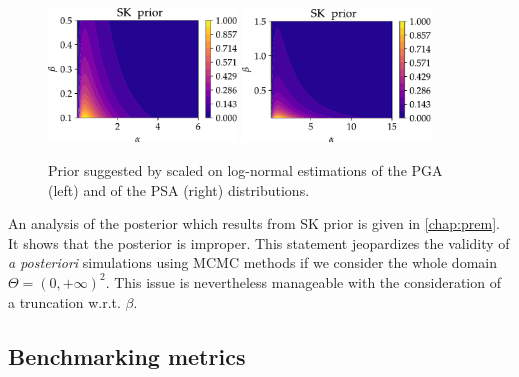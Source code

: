             \begin{figure}[!ht]
                \centering
                {\includegraphics[width=5cm]{figures/PREM/SK_prior_PGA.pdf}}\hspace*{0.5cm}
                {\includegraphics[width=5cm]{figures/PREM/SK_prior_PSA.pdf}}                
                \caption{Prior suggested by \citet{straub_improved_2008} scaled on log-normal estimations of the PGA (left) and of the PSA (right) distributions.}
                 \label{uncIM:fig:Straubprior}
            \end{figure}

            An analysis of the posterior which results from SK prior is given in \cref{chap:prem}. It shows that the posterior is improper. This statement jeopardizes the validity of \emph{a posteriori} simulations using MCMC methods if we consider the whole domain $\Theta=(0,+\infty)^2$. This issue is nevertheless manageable with the consideration of a truncation w.r.t. $\beta$.
            
            
    \subsection{Benchmarking metrics} \label{uncIM:sec:metrics}
    
